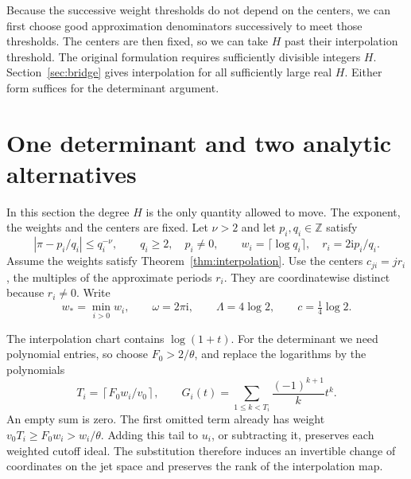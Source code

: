 \documentclass[11pt]{article}
\theoremstyle{definition}
\theoremstyle{remark}
\newcommand{\Z}{\mathbb Z}
\newcommand{\ii}{\mathrm i}
\numberwithin{equation}{section}
\begin{document}
Because the successive weight thresholds do not depend on the centers,
we can first choose good approximation denominators successively to meet
those thresholds. The centers are then fixed, so we can take \(H\) past
their interpolation threshold. The original formulation requires
sufficiently divisible integers \(H\). Section~\ref{sec:bridge} gives
interpolation for all sufficiently large real \(H\). Either form
suffices for the determinant argument.

\section{One determinant and two analytic alternatives}\label{sec:determinant}
In this section the degree \(H\) is the only quantity allowed to move.
The exponent, the weights and the centers are fixed. Let \(\nu>2\)
and let \(p_i,q_i\in\Z\) satisfy
\begin{equation}\label{eq:approximants}
 |\pi-p_i/q_i|\le q_i^{-\nu},\qquad q_i\ge2,\quad p_i\ne0,
 \qquad w_i=\lceil\log q_i\rceil,\quad r_i=2\ii p_i/q_i.
\end{equation}
Assume the weights satisfy Theorem~\ref{thm:interpolation}.
Use the centers \(c_{ji}=jr_i\), the multiples of the approximate periods
\(r_i\). They are coordinatewise distinct
because \(r_i\ne0\). Write
\[
 w_* =\min_{i>0}w_i,\qquad \omega=2\pi\ii,
 \qquad \Lambda=4\log2,\qquad c=\tfrac14\log2.
\]

The interpolation chart contains \(\log(1+t)\). For the determinant we
need polynomial entries, so choose \(F_0>2/\theta\), and replace the
logarithms by the polynomials
\begin{equation}\label{eq:truncation}
 T_i=\left\lceil F_0w_i/v_0\right\rceil,\qquad
 G_i(t)=\sum_{1\le k<T_i}\frac{(-1)^{k+1}}k t^k.
\end{equation}
An empty sum is zero. The first omitted term already has weight
\(v_0T_i\ge F_0w_i>w_i/\theta\). Adding this tail to \(u_i\), or
subtracting it, preserves each weighted cutoff ideal. The substitution
therefore induces an invertible change of coordinates on the jet space
and preserves the rank of the interpolation map.
\end{document}
